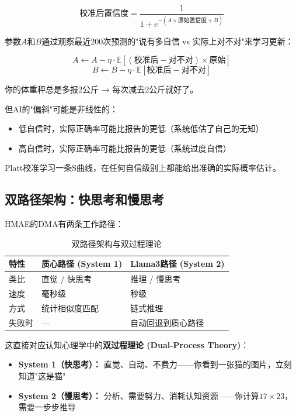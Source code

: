 \documentclass[11pt,a4paper]{ctexart}
\begin{document}
$$\text{校准后置信度} = \frac{1}{1 + e^{-(A \times \text{原始置信度} + B)}}$$

参数$A$和$B$通过观察最近200次预测的"说有多自信 vs 实际上对不对"来学习更新：

$$A \leftarrow A - \eta \cdot \mathbb{E}[(\text{校准后} - \text{对不对}) \times \text{原始}]$$
$$B \leftarrow B - \eta \cdot \mathbb{E}[\text{校准后} - \text{对不对}]$$

\begin{exambox}
你的体重秤总是多报2公斤 → 每次减去2公斤就好了。

但AI的"偏斜"可能是非线性的：
\begin{itemize}[nosep]
\item 低自信时，实际正确率可能比报告的更低（系统低估了自己的无知）
\item 高自信时，实际正确率可能比报告的更低（系统过度自信）
\end{itemize}
Platt校准学习一条S曲线，在任何自信级别上都能给出准确的实际概率估计。
\end{exambox}

\subsection{双路径架构：快思考和慢思考}

HMAE的DMA有两条工作路径：

\begin{table}[H]
\centering
\small
\begin{tabular}{lll}
\toprule
\textbf{特性} & \textbf{质心路径 (System 1)} & \textbf{Llama3路径 (System 2)} \\
\midrule
类比 & 直觉 / 快思考 & 推理 / 慢思考 \\
速度 & 毫秒级 & 秒级 \\
方式 & 统计相似度匹配 & 链式推理 \\
失败时 & — & 自动回退到质心路径 \\
\bottomrule
\end{tabular}
\caption{双路径架构与双过程理论}
\end{table}

这直接对应认知心理学中的\textbf{双过程理论 (Dual-Process Theory)}：
\begin{itemize}[nosep]
\item \textbf{System 1（快思考）：} 直觉、自动、不费力——你看到一张猫的图片，立刻知道"这是猫"
\item \textbf{System 2（慢思考）：} 分析、需要努力、消耗认知资源——你计算$17 \times 23$，需要一步步推导
\end{itemize}
\end{document}

